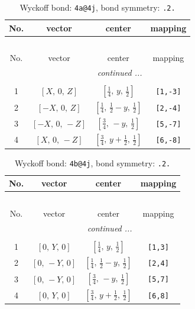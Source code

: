 \documentclass[fleqn,8pt]{jsarticle}
\begin{document}
\begin{longtable}{cccc}
\caption{Wyckoff bond: {\tt 4a@4j}, bond symmetry: {\tt .2.}}
 \\
 \hline \hline
No. & vector & center & mapping \\ \hline \endfirsthead

\multicolumn{3}{l}{\tablename\ \thetable{}} \\
 \hline \hline
No. & vector & center & mapping \\ \hline \endhead

 \hline \hline
\multicolumn{3}{r}{\footnotesize\it continued ...} \\ \endfoot

 \hline \hline
\multicolumn{3}{r}{} \\ \endlastfoot

1 & $\left[ X,\, 0,\, Z \right]$ & $\left[ \frac{1}{4},\, y,\, \frac{1}{2} \right]$ & {\tt [1,-3]} \\ \hline
2 & $\left[ - X,\, 0,\, Z \right]$ & $\left[ \frac{1}{4},\, \frac{1}{2} - y,\, \frac{1}{2} \right]$ & {\tt [2,-4]} \\ \hline
3 & $\left[ - X,\, 0,\, - Z \right]$ & $\left[ \frac{3}{4},\, - y,\, \frac{1}{2} \right]$ & {\tt [5,-7]} \\ \hline
4 & $\left[ X,\, 0,\, - Z \right]$ & $\left[ \frac{3}{4},\, y + \frac{1}{2},\, \frac{1}{2} \right]$ & {\tt [6,-8]} \\
\end{longtable}
\renewcommand{\arraystretch}{1.2}
\begin{longtable}{cccc}
\caption{Wyckoff bond: {\tt 4b@4j}, bond symmetry: {\tt .2.}}
 \\
 \hline \hline
No. & vector & center & mapping \\ \hline \endfirsthead

\multicolumn{3}{l}{\tablename\ \thetable{}} \\
 \hline \hline
No. & vector & center & mapping \\ \hline \endhead

 \hline \hline
\multicolumn{3}{r}{\footnotesize\it continued ...} \\ \endfoot

 \hline \hline
\multicolumn{3}{r}{} \\ \endlastfoot

1 & $\left[ 0,\, Y,\, 0 \right]$ & $\left[ \frac{1}{4},\, y,\, \frac{1}{2} \right]$ & {\tt [1,3]} \\ \hline
2 & $\left[ 0,\, - Y,\, 0 \right]$ & $\left[ \frac{1}{4},\, \frac{1}{2} - y,\, \frac{1}{2} \right]$ & {\tt [2,4]} \\ \hline
3 & $\left[ 0,\, - Y,\, 0 \right]$ & $\left[ \frac{3}{4},\, - y,\, \frac{1}{2} \right]$ & {\tt [5,7]} \\ \hline
4 & $\left[ 0,\, Y,\, 0 \right]$ & $\left[ \frac{3}{4},\, y + \frac{1}{2},\, \frac{1}{2} \right]$ & {\tt [6,8]} \\
\end{longtable}
\end{document}
